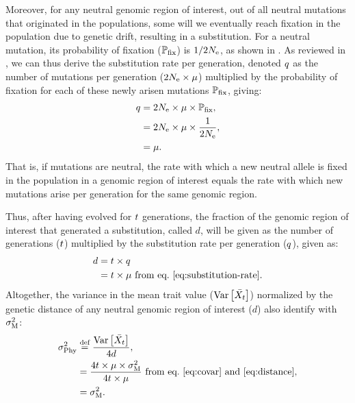 \documentclass{article}
\begin{document}
Moreover, for any neutral genomic region of interest, out of all neutral mutations that originated in the populations, some will we eventually reach fixation in the population due to genetic drift, resulting in a substitution.
For a neutral mutation, its probability of fixation ($\mathbb{P}_{\text{fix}}$) is $1/2N_{\text{e}}$, as shown in \textcite{kimura_probability_1962}.
As reviewed in \textcite{mccandlish_modeling_2014}, we can thus derive the substitution rate per generation, denoted $q$ as the number of mutations per generation ($2N_{\text{e}} \times \mu$) multiplied by the probability of fixation for each of these newly arisen mutations $\mathbb{P}_{\text{fix}}$, giving:
\begin{align}
    q & = 2 N_{\text{e}} \times \mu \times \mathbb{P}_{\text{fix}}, \\
    & = 2 N_{\text{e}}  \times \mu  \times \dfrac{1}{2N_{\text{e}}}, \\
    & = \mu. \label{eq:substitution-rate}
\end{align}
That is, if mutations are neutral, the rate with which a new neutral allele is fixed in the population in a genomic region of interest equals the rate with which new mutations arise per generation for the same genomic region\cite{kimura_evolutionary_1968}.

Thus, after having evolved for $t$ generations, the fraction of the genomic region of interest that generated a substitution, called $d$, will be given as the number of generations ($t$) multiplied by the substitution rate per generation ($q$), given as:
\begin{align}
    d & = t \times q \\
    & = t \times \mu \text{ from eq.~\ref{eq:substitution-rate}}. \label{eq:distance}
\end{align}
Altogether, the variance in the mean trait value ($\operatorname{\text{Var}} \left[\bar{X_{t}}\right]$) normalized by the genetic distance of any neutral genomic region of interest ($d$) also identify with $\sigma^2_{\text{M}}$:
\begin{align}
    \sigma^2_{\text{Phy}} & \stackrel{\text{def}}{=} \frac{\operatorname{\text{Var}} \left[\bar{X_{t}}\right]}{4 d},\\
    & = \frac{4 t \times \mu \times \sigma^2_{\text{M}}}{4 t \times \mu}\text{ from eq.~\ref{eq:covar} and~\ref{eq:distance}}, \\
    & = \sigma^2_{\text{M}} \label{eq:rate-phy}.
\end{align}
\end{document}
